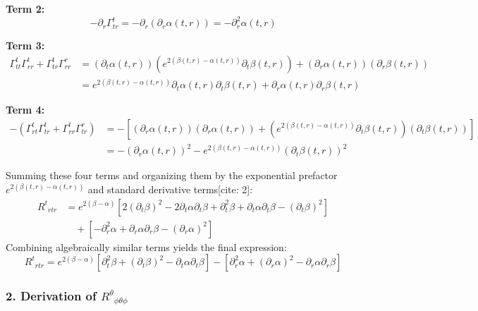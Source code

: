 \documentclass[11pt, a4paper]{report}
\begin{document}
\textbf{Term 2:}
\begin{equation}
    -\partial_r \Gamma^t_{tr} = -\partial_r \left( \partial_r \alpha(t,r) \right) = -\partial_r^2 \alpha(t,r)
\end{equation}

\textbf{Term 3:}
\begin{align}
    \Gamma^t_{tt}\Gamma^t_{rr} + \Gamma^t_{tr}\Gamma^r_{rr} &= (\partial_t \alpha(t,r)) \left( e^{2(\beta(t,r) - \alpha(t,r))} \partial_t \beta(t,r) \right) + (\partial_r \alpha(t,r))(\partial_r \beta(t,r)) \nonumber \\
    &= e^{2(\beta(t,r) - \alpha(t,r))} \partial_t \alpha(t,r) \partial_t \beta(t,r) + \partial_r \alpha(t,r) \partial_r \beta(t,r)
\end{align}

\textbf{Term 4:}
\begin{align}
    -\left(\Gamma^t_{rt}\Gamma^t_{tr} + \Gamma^t_{rr}\Gamma^r_{tr}\right) &= - \left[ (\partial_r \alpha(t,r))(\partial_r \alpha(t,r)) + \left( e^{2(\beta(t,r) - \alpha(t,r))} \partial_t \beta(t,r) \right) (\partial_t \beta(t,r)) \right] \nonumber \\
    &= -(\partial_r \alpha(t,r))^2 - e^{2(\beta(t,r) - \alpha(t,r))} (\partial_t \beta(t,r))^2
\end{align}

Summing these four terms and organizing them by the exponential prefactor $e^{2(\beta(t,r) - \alpha(t,r))}$ and standard derivative terms[cite: 2]:
\begin{align}
    {R^t}_{rtr} &= e^{2(\beta - \alpha)} \left[ 2(\partial_t \beta)^2 - 2\partial_t \alpha \partial_t \beta + \partial_t^2 \beta + \partial_t \alpha \partial_t \beta - (\partial_t \beta)^2 \right] \nonumber \\
    &\quad + \left[ -\partial_r^2 \alpha + \partial_r \alpha \partial_r \beta - (\partial_r \alpha)^2 \right]
\end{align}
Combining algebraically similar terms yields the final expression:
\begin{equation}
    {R^t}_{rtr} = e^{2(\beta - \alpha)} \left[ \partial_t^2 \beta + (\partial_t \beta)^2 - \partial_t \alpha \partial_t \beta \right] - \left[ \partial_r^2 \alpha + (\partial_r \alpha)^2 - \partial_r \alpha \partial_r \beta \right]
\end{equation}

\subsubsection*{2. Derivation of ${R^\theta}_{\phi\theta\phi}$}
\end{document}
